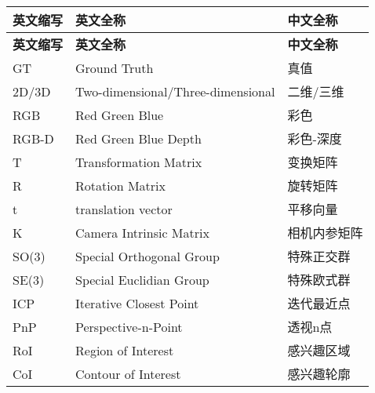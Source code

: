 \cleardoublepage
{}
\begin{center}
    \begin{longtable}{m{2cm}m{8cm}m{5cm}}
        \toprule
        \textbf{英文缩写}&\textbf{英文全称}&\textbf{中文全称}\\
        \midrule
        \endfirsthead
        \toprule
        \textbf{英文缩写}&\textbf{英文全称}&\textbf{中文全称}\\
        \midrule
        \endhead 
        \bottomrule
        \endfoot
        \bottomrule
        \endlastfoot
        GT&Ground Truth&真值\\
        2D/3D&Two-dimensional/Three-dimensional&二维/三维\\
        RGB&Red Green Blue&彩色\\
        RGB-D&Red Green Blue Depth&彩色-深度\\
        T&Transformation Matrix&变换矩阵\\
        R&Rotation Matrix&旋转矩阵\\
        t&translation vector&平移向量\\
        K&Camera Intrinsic Matrix&相机内参矩阵\\
        SO(3)&Special Orthogonal Group&特殊正交群\\
        SE(3)&Special Euclidian Group&特殊欧式群\\
        ICP&Iterative Closest Point&迭代最近点\\
        PnP&Perspective-n-Point&透视n点\\
        RoI&Region of Interest&感兴趣区域\\
        CoI&Contour of Interest&感兴趣轮廓\\

	\end{longtable}
\end{center}